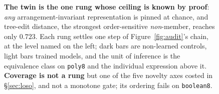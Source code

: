 \begin{figure}[t]
{}
%
%
\caption{\textbf{The twin is the one rung whose ceiling is known by proof}: \emph{any}
arrangement-invariant representation is pinned at chance, and tree-edit distance, the strongest
order-sensitive \emph{non}-member, reaches only $0.723$. Each rung settles one step of
Figure~\ref{fig:audit}'s chain, at the level named on the left; dark bars are non-learned controls,
light bars trained models, and the unit of inference is the equivalence class on \texttt{poly8} and the
individual expression above it. \textbf{Coverage is not a rung} but one of the five novelty axes costed
in \S\ref{sec:loso}, and not a monotone gate; its ordering fails on \texttt{boolean8}.}
\label{fig:framework}
\end{figure}
